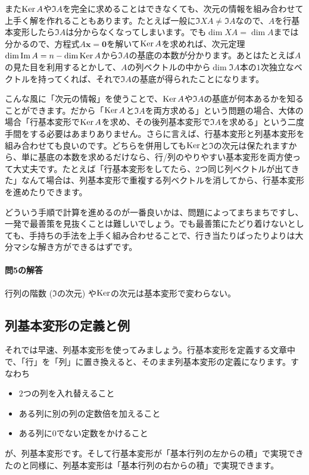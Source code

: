 また$\operatorname{Ker} A$や$\Im A$を完全に求めることはできなくても、次元の情報を組み合わせて上手く解を作れることもあります。たとえば一般に$\Im XA \neq \Im A$なので、$A$を行基本変形したら$\Im A$は分からなくなってしまいます。でも$\dim XA = \dim A$までは分かるので、方程式$A\bm{x} = \bm{0}$を解いて$\operatorname{Ker} A$を求めれば、次元定理$\dim \mathrm{Im}\, A = n - \dim \operatorname{Ker} A$から$\Im A$の基底の本数が分かります。あとはたとえば$A$の見た目を利用するとかして、$A$の列ベクトルの中から$\dim \Im A$本の$1$次独立なベクトルを持ってくれば、それで$\Im A$の基底が得られたことになります。

こんな風に「次元の情報」を使うことで、$\operatorname{Ker} A$や$\Im A$の基底が何本あるかを知ることができます。だから「$\operatorname{Ker} A$と$\Im A$を両方求める」という問題の場合、大体の場合「行基本変形で$\operatorname{Ker} A$を求め、その後列基本変形で$\Im A$を求める」という二度手間をする必要はあまりありません。さらに言えば、行基本変形と列基本変形を組み合わせても良いのです。どちらを併用しても$\operatorname{Ker}$と$\Im$の次元は保たれますから、単に基底の本数を求めるだけなら、行/列のやりやすい基本変形を両方使って大丈夫です。たとえば「行基本変形をしてたら、$2$つ同じ列ベクトルが出てきた」なんて場合は、列基本変形で重複する列ベクトルを消してから、行基本変形を進めたりできます。

どういう手順で計算を進めるのが一番良いかは、問題によってまちまちですし、一発で最善策を見抜くことは難しいでしょう。でも最善策にたどり着けないとしても、手持ちの手法を上手く組み合わせることで、行き当たりばったりよりは大分マシな解き方ができるはずです。

\paragraph{問5の解答}

行列の階数 ($\Im$の次元) や$\operatorname{Ker}$の次元は基本変形で変わらない。

\subsection{列基本変形の定義と例} \label{subsection:column_elementary_operation}

それでは早速、列基本変形を使ってみましょう。行基本変形を定義する文章中で、「行」を「列」に置き換えると、そのまま列基本変形の定義になります。すなわち
\begin{itemize}
\item $2$つの列を入れ替えること
\item ある列に別の列の定数倍を加えること
\item ある列に$0$でない定数をかけること
\end{itemize}
が、列基本変形です。そして行基本変形が「基本行列の左からの積」で実現できたのと同様に、列基本変形は「基本行列の右からの積」で実現できます。


